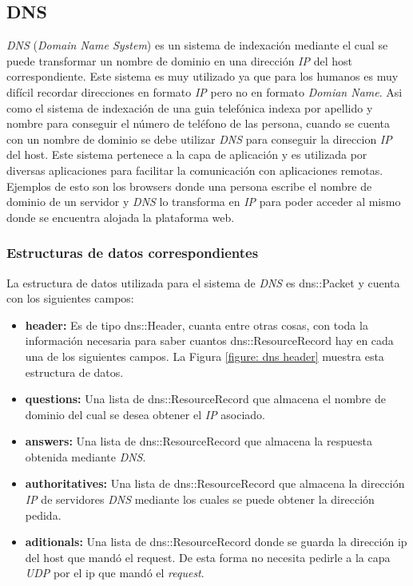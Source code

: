 \documentclass[10pt,a4paper]{article}
\begin{document}
\subsection{DNS}
\textit{DNS} (\textit{Domain Name System}) es un sistema de indexación mediante el cual se puede transformar un nombre de dominio en una dirección \textit{IP} del host correspondiente. Este sistema es muy utilizado ya que para los humanos es muy difícil recordar direcciones en formato \textit{IP} pero no en formato \textit{Domian Name}. Asi como el sistema de indexación de una guia telefónica indexa por apellido y nombre para conseguir el número de teléfono de las persona, cuando se cuenta con un nombre de dominio se debe utilizar \textit{DNS} para conseguir la direccion \textit{IP} del host. Este sistema pertenece a la capa de aplicación y es utilizada por diversas aplicaciones para facilitar la comunicación con aplicaciones remotas. Ejemplos de esto son los browsers donde una persona escribe el nombre de dominio de un servidor y \textit{DNS} lo transforma en \textit{IP} para poder acceder al mismo donde se encuentra alojada la plataforma web. 

\subsubsection{Estructuras de datos correspondientes}
La estructura de datos utilizada para el sistema de \textit{DNS} es dns::Packet y cuenta con los siguientes campos:
\begin{itemize}
\item \textbf{header: } Es de tipo dns::Header, cuanta entre otras cosas, con toda la información necesaria para saber cuantos dns::ResourceRecord hay en cada una de los siguientes campos. La Figura \ref{figure: dns header} muestra esta estructura de datos.
\item \textbf{questions: } Una lista de dns::ResourceRecord que almacena el nombre de dominio del cual se desea obtener el \textit{IP} asociado.
\item \textbf{answers: } Una lista de dns::ResourceRecord que almacena la respuesta obtenida mediante \textit{DNS}.
\item \textbf{authoritatives: } Una lista de dns::ResourceRecord que almacena la dirección \textit{IP} de servidores \textit{DNS} mediante los cuales se puede obtener la dirección pedida.
\item \textbf{aditionals: } Una lista de dns::ResourceRecord donde se guarda la dirección ip del host que mandó el request. De esta forma no necesita pedirle a la capa \textit{UDP} por el ip que mandó el \textit{request}.
\end{itemize}
\end{document}
